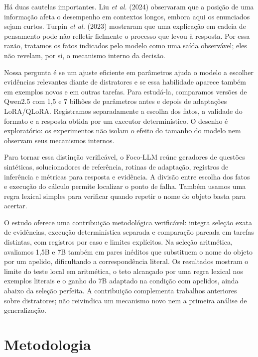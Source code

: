 \documentclass[12pt,a4paper]{article}
\begin{document}
Há duas cautelas importantes. Liu \textit{et al.} (2024) observaram que a posição de uma informação afeta o desempenho em contextos longos, embora aqui os enunciados sejam curtos. Turpin \textit{et al.} (2023) mostraram que uma explicação em cadeia de pensamento pode não refletir fielmente o processo que levou à resposta. Por essa razão, tratamos os fatos indicados pelo modelo como uma saída observável; eles não revelam, por si, o mecanismo interno da decisão.

Nossa pergunta é se um ajuste eficiente em parâmetros ajuda o modelo a escolher evidências relevantes diante de distratores e se essa habilidade aparece também em exemplos novos e em outras tarefas. Para estudá-la, comparamos versões de Qwen2.5 com 1,5 e 7 bilhões de parâmetros antes e depois de adaptações LoRA/QLoRA. Registramos separadamente a escolha dos fatos, a validade do formato e a resposta obtida por um executor determinístico. O desenho é exploratório: os experimentos não isolam o efeito do tamanho do modelo nem observam seus mecanismos internos.

Para tornar essa distinção verificável, o Foco-LLM reúne geradores de questões sintéticas, solucionadores de referência, rotinas de adaptação, registros de inferência e métricas para resposta e evidência. A divisão entre escolha dos fatos e execução do cálculo permite localizar o ponto de falha. Também usamos uma regra lexical simples para verificar quando repetir o nome do objeto basta para acertar.

O estudo oferece uma contribuição metodológica verificável: integra seleção exata de evidências, execução determinística separada e comparação pareada em tarefas distintas, com registros por caso e limites explícitos. Na seleção aritmética, avaliamos 1,5B e 7B também em pares inéditos que substituem o nome do objeto por um apelido, dificultando a correspondência literal. Os resultados mostram o limite do teste local em aritmética, o teto alcançado por uma regra lexical nos exemplos literais e o ganho do 7B adaptado na condição com apelidos, ainda abaixo da seleção perfeita. A contribuição complementa trabalhos anteriores sobre distratores; não reivindica um mecanismo novo nem a primeira análise de generalização.

\section{Metodologia}
\end{document}
